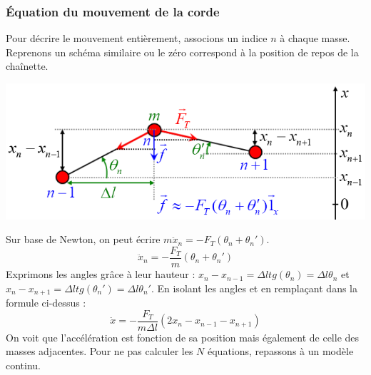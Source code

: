 \documentclass	[11pt, a4paper, openany]{book}
\begin{document}
		\subsubsection{Équation du mouvement de la corde}
		Pour décrire le mouvement entièrement, associons un indice $n$ à chaque masse. Reprenons un schéma similaire ou le zéro correspond à la position de repos de la chaînette.
		\begin{center}
			\includegraphics[scale=0.55]{oo/image24.png}
		\end{center}
		Sur base de Newton, on peut écrire $m\ddot{x}_n = -F_T(\theta_n + \theta_n')$.
		\begin{equation}
			\ddot{x}_n = -\frac{F_T}{m}(\theta_n + \theta_n')
		\end{equation}
		Exprimons les angles grâce à leur hauteur  : $x_n - x_{n-1} = \Delta l tg(\theta_n) = \Delta l \theta_n$ et $x_n - x_{n+1} = \Delta l tg(\theta_n') = \Delta l \theta_n'$. En isolant les angles et en remplaçant dans la formule ci-dessus : 
		\begin{equation}
			\ddot{x} = -\frac{F_T}{m\Delta l}(2x_n - x_{n-1} - x_{n+1})
		\end{equation}
		On voit que l'accélération est fonction de sa position mais également de celle des masses adjacentes. Pour ne pas calculer les $N$ équations, repassons à un modèle continu.\\
		
\end{document}
